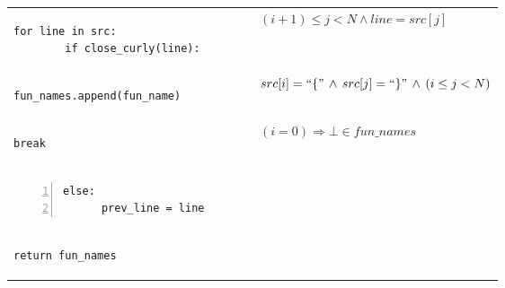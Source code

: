 \documentclass[10pt, a4paper]{article}
\begin{document}
\begin{tabular}{@{}ll@{}}
\lstset{backgroundcolor=\color{lightgreen}}
{\begin{lstlisting}[firstnumber=last]
      for line in src:
        if close_curly(line):
\end{lstlisting}}
& $(i+1) \le j < N \wedge line = src[j]$\\
\lstset{backgroundcolor=\color{lightgreen}}
{\begin{lstlisting}[firstnumber=last]
          fun_names.append(fun_name)
\end{lstlisting}}
&$src[i] = ``\{"\,\wedge\,src[j] = ``\}"\,\wedge\,(i \le j < N)$\\
\lstset{backgroundcolor=\color{lightgreen}}
{\begin{lstlisting}[firstnumber=last]
          break
\end{lstlisting}}
& $(i = 0) \Rightarrow \bot \in fun\_names $\\

{\noindent\hspace*{0.35em}\begin{lstlisting}[numbers=left, firstnumber=last]
    else:
      prev_line = line
\end{lstlisting}}
&\\
{\noindent\hspace*{0.35em}\begin{lstlisting}[firstnumber=last]
  return fun_names
\end{lstlisting}}

\end{tabular}
\end{document}
